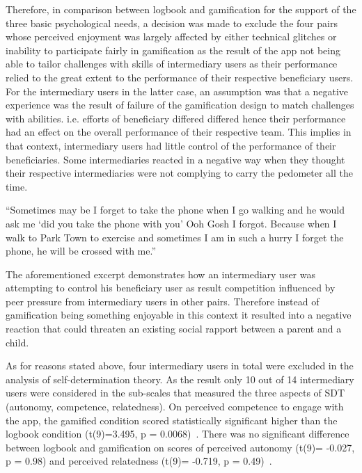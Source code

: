 Therefore, in comparison between logbook and gamification for the support of the three basic psychological needs, a decision was made to exclude the four pairs whose perceived enjoyment was largely affected by either technical glitches or inability to participate fairly in gamification as the result of the app not being able to tailor challenges with skills of intermediary users as their performance relied to the great extent to the performance of their respective beneficiary users. For the intermediary users in the latter case, an assumption was that a negative experience was the result of failure of the gamification design to match challenges with abilities. i.e. efforts of beneficiary differed differed hence their performance had an effect on the overall performance of their respective team. This implies in that context, intermediary users had little control of the performance of their beneficiaries. Some intermediaries reacted in a negative way when they thought their respective intermediaries were not complying to carry the pedometer all the time.

 {``Sometimes may be I forget to take the phone when I go walking and he would ask me `did you take the phone with you' Ooh Gosh I forgot.  Because when I walk to Park Town to exercise and sometimes  I am in such a hurry I forget the phone, he will be crossed with me.''} 

The aforementioned excerpt demonstrates how an intermediary user was attempting to control his beneficiary user as result competition influenced by peer pressure from intermediary users in other pairs. Therefore instead of gamification being something enjoyable in this context it resulted into a negative reaction that could threaten an existing social rapport between a parent and a child.

As for reasons stated above, four intermediary users in total were excluded in the analysis of self-determination theory. As the result only 10 out of 14 intermediary users were considered in the sub-scales that measured the three aspects of SDT (autonomy, competence, relatedness). On perceived competence to engage with the app, the gamified condition scored statistically significant higher than the logbook condition (t(9)=3.495, p = 0.0068)~\citep{katule2016family}. There was no significant difference between logbook and gamification on scores of perceived autonomy (t(9)= -0.027, p =  0.98) and perceived relatedness (t(9)= -0.719, p = 0.49)~\citep{katule2016family}.

